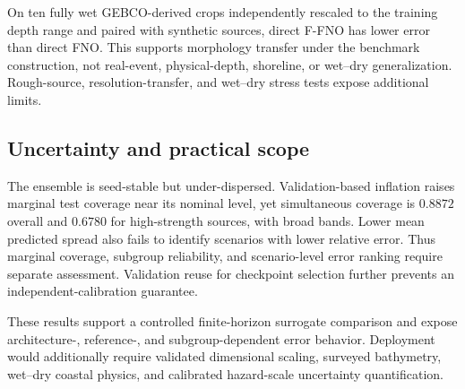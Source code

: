 On ten fully wet GEBCO-derived crops independently rescaled to the training depth range and paired with synthetic sources, direct F-FNO has lower error than direct FNO. This supports morphology transfer under the benchmark construction, not real-event, physical-depth, shoreline, or wet--dry generalization. Rough-source, resolution-transfer, and wet--dry stress tests expose additional limits.

\subsection{Uncertainty and practical scope}
The ensemble is seed-stable but under-dispersed. Validation-based inflation raises marginal test coverage near its nominal level, yet simultaneous coverage is $0.8872$ overall and $0.6780$ for high-strength sources, with broad bands. Lower mean predicted spread also fails to identify scenarios with lower relative error. Thus marginal coverage, subgroup reliability, and scenario-level error ranking require separate assessment. Validation reuse for checkpoint selection further prevents an independent-calibration guarantee.

These results support a controlled finite-horizon surrogate comparison and expose architecture-, reference-, and subgroup-dependent error behavior. Deployment would additionally require validated dimensional scaling, surveyed bathymetry, wet--dry coastal physics, and calibrated hazard-scale uncertainty quantification.
